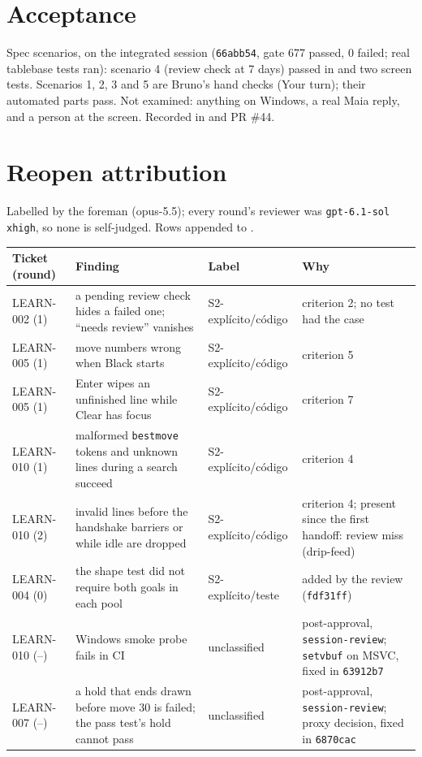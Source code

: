 \documentclass[11pt,a4paper]{article}
\begin{document}
\section*{Acceptance}

Spec scenarios, on the integrated session (\texttt{66abb54}, gate 677 passed, 0 failed; real
tablebase tests ran): scenario 4 (review check at 7 days) passed in
 and two screen tests.
Scenarios 1, 2, 3 and 5 are Bruno's hand checks (Your turn); their automated parts pass. Not
examined: anything on Windows, a real Maia reply, and a person at the screen. Recorded in
 and PR \#44.

\section*{Reopen attribution}

Labelled by the foreman (opus-5.5); every round's reviewer was \texttt{gpt-6.1-sol xhigh}, so
none is self-judged. Rows appended to .

{\small\noindent
\begin{tabularx}{\linewidth}{@{}>{\raggedright\arraybackslash}p{1.9cm}X>{\raggedright\arraybackslash}p{2.7cm}X@{}}
\toprule
Ticket (round) & Finding & Label & Why \\
\midrule
LEARN-002 (1) & a pending review check hides a failed one; ``needs review'' vanishes & S2-explícito/código & criterion 2; no test had the case \\
LEARN-005 (1) & move numbers wrong when Black starts & S2-explícito/código & criterion 5 \\
LEARN-005 (1) & Enter wipes an unfinished line while Clear has focus & S2-explícito/código & criterion 7 \\
LEARN-010 (1) & malformed \texttt{bestmove} tokens and unknown lines during a search succeed & S2-explícito/código & criterion 4 \\
LEARN-010 (2) & invalid lines before the handshake barriers or while idle are dropped & S2-explícito/código & criterion 4; present since the first handoff: review miss (drip-feed) \\
LEARN-004 (0) & the shape test did not require both goals in each pool & S2-explícito/teste & added by the review (\texttt{fdf31ff}) \\
LEARN-010 (--) & Windows smoke probe fails in CI & unclassified & post-approval, \texttt{session-review}; \texttt{setvbuf} on MSVC, fixed in \texttt{63912b7} \\
LEARN-007 (--) & a hold that ends drawn before move 30 is failed; the pass test's hold cannot pass & unclassified & post-approval, \texttt{session-review}; proxy decision, fixed in \texttt{6870cac} \\
\bottomrule
\end{tabularx}
}
\end{document}
